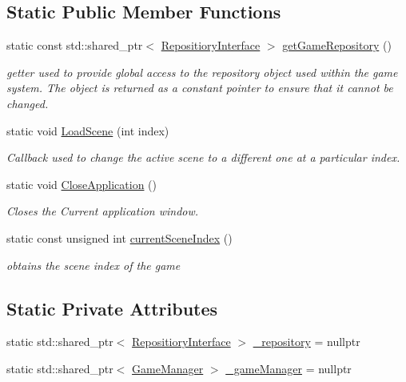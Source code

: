\subsection*{Static Public Member Functions}
\begin{DoxyCompactItemize}
\item 
static const std\+::shared\+\_\+ptr$<$ \hyperlink{class_repositiory_interface}{Repositiory\+Interface} $>$ \hyperlink{class_application_aa895ae75cdb47ab91584c32b0db0ca06}{get\+Game\+Repository} ()
\begin{DoxyCompactList}\small\item\em getter used to provide global access to the repository object used within the game system. The object is returned as a constant pointer to ensure that it cannot be changed. \end{DoxyCompactList}\item 
static void \hyperlink{class_application_ac73bbfb4af8c54f6ae777863b7fa7099}{Load\+Scene} (int index)
\begin{DoxyCompactList}\small\item\em Callback used to change the active scene to a different one at a particular index. \end{DoxyCompactList}\item 
\mbox{\label{class_application_ab105d17f9a88e55db9b64b6b0e190b12}} 
static void \hyperlink{class_application_ab105d17f9a88e55db9b64b6b0e190b12}{Close\+Application} ()
\begin{DoxyCompactList}\small\item\em Closes the Current application window. \end{DoxyCompactList}\item 
static const unsigned int \hyperlink{class_application_aaad856399fbe63c7f14a95fc59d0111f}{current\+Scene\+Index} ()
\begin{DoxyCompactList}\small\item\em obtains the scene index of the game \end{DoxyCompactList}\end{DoxyCompactItemize}
\subsection*{Static Private Attributes}
\begin{DoxyCompactItemize}
\item 
static std\+::shared\+\_\+ptr$<$ \hyperlink{class_repositiory_interface}{Repositiory\+Interface} $>$ \hyperlink{class_application_af7e1a832b2f8dbc3a283cb29f7a89c01}{\+\_\+repository} = nullptr
\item 
static std\+::shared\+\_\+ptr$<$ \hyperlink{class_game_manager}{Game\+Manager} $>$ \hyperlink{class_application_a4e102be4f84b7a22a159f6030bc022bd}{\+\_\+game\+Manager} = nullptr
\end{DoxyCompactItemize}


